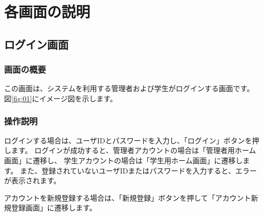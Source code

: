 \section{各画面の説明}
\subsection{ログイン画面}
\subsubsection{画面の概要}
この画面は、システムを利用する管理者および学生がログインする画面です。
図\ref{fig:01}にイメージ図を示します。

\subsubsection{操作説明}
ログインする場合は、ユーザIDとパスワードを入力し、「ログイン」ボタンを押します。
ログインが成功すると、管理者アカウントの場合は「管理者用ホーム画面」に遷移し、
学生アカウントの場合は「学生用ホーム画面」に遷移します。
また、登録されていないユーザIDまたはパスワードを入力すると、エラーが表示されます。

アカウントを新規登録する場合は、「新規登録」ボタンを押して「アカウント新規登録画面」に遷移します。

\newpage



